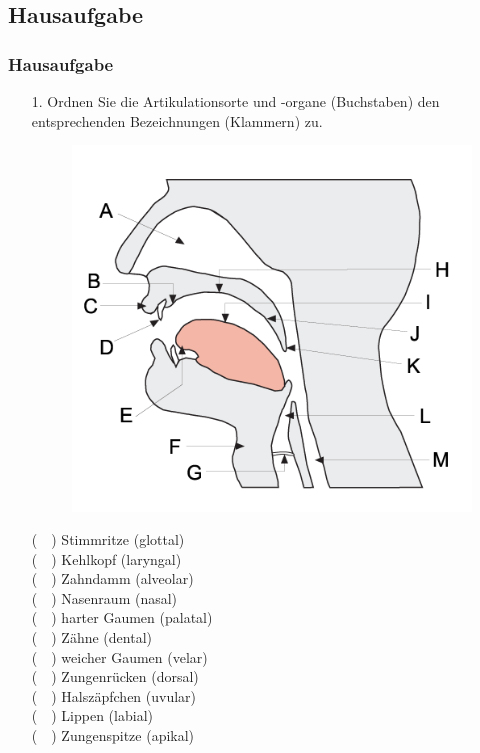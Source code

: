 \subsection{Hausaufgabe}

\begin{frame}
\frametitle{Hausaufgabe}
\begin{itemize}
	\item[1.] Ordnen Sie die Artikulationsorte und -organe (Buchstaben) den entsprechenden Bezeichnungen (Klammern) zu.
	
\begin{minipage}{0.48\textwidth}
	\begin{figure}
		\centering
		\includegraphics[scale=0.33]{material/04phonoatonomy}
	\end{figure}
\end{minipage}
\hfill
\begin{minipage}{0.4\textwidth}
	
		(~~) Stimmritze (glottal)\\
		(~~) Kehlkopf (laryngal)\\
		(~~) Zahndamm (alveolar)\\
		(~~) Nasenraum (nasal)\\
		(~~) harter Gaumen (palatal)\\
		(~~) Zähne (dental)\\
		(~~) weicher Gaumen (velar)\\
		(~~) Zungenrücken (dorsal)\\
		(~~) Halszäpfchen (uvular)\\
		(~~) Lippen (labial)\\
		(~~) Zungenspitze (apikal)
\end{minipage}

\end{itemize}
\end{frame}


